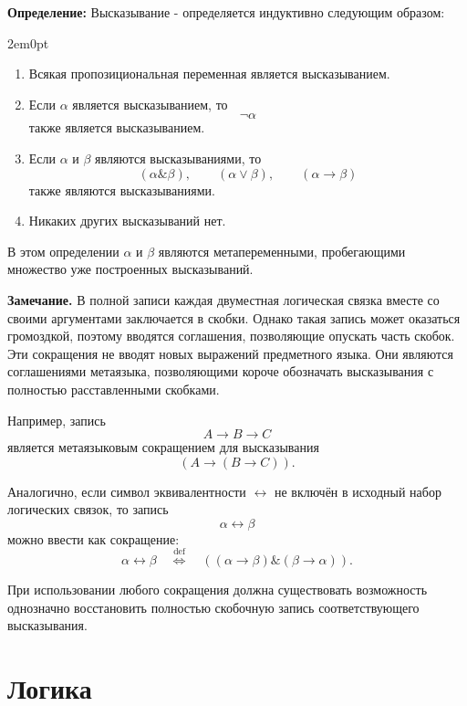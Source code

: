 \documentclass[12pt,a4paper,oneside,openany]{book}
\theoremstyle{definition}
\theoremstyle{plain}
\theoremstyle{remark}
\begin{document}
\textbf{Определение:} Высказывание - определяется индуктивно следующим образом:
\begin{adjustwidth}{2em}{0pt}
\begin{enumerate}
    \item Всякая пропозициональная переменная является высказыванием.

    \item Если \(\alpha\) является высказыванием, то
    \[
    \neg\alpha
    \]
    также является высказыванием.

    \item Если \(\alpha\) и \(\beta\) являются высказываниями, то
    \[
    (\alpha\mathbin{\&}\beta),\qquad
    (\alpha\lor\beta),\qquad
    (\alpha\to\beta)
    \]
    также являются высказываниями.

    \item Никаких других высказываний нет.
\end{enumerate}
\end{adjustwidth}

В этом определении \(\alpha\) и \(\beta\) являются метапеременными,
пробегающими множество уже построенных высказываний.


\vspace{10mm}
\noindent\textbf{Замечание.}
В полной записи каждая двуместная логическая связка вместе со своими
аргументами заключается в скобки. Однако такая запись может оказаться
громоздкой, поэтому вводятся соглашения, позволяющие опускать часть
скобок.
Эти сокращения не вводят новых выражений предметного языка.
Они являются соглашениями метаязыка, позволяющими короче обозначать
высказывания с полностью расставленными скобками.

Например, запись
\[
A\to B\to C
\]
является метаязыковым сокращением для высказывания
\[
(A\to(B\to C)).
\]

Аналогично, если символ эквивалентности \(\leftrightarrow\) не включён
в исходный набор логических связок, то запись
\[
\alpha\leftrightarrow\beta
\]
можно ввести как сокращение:
\[
\alpha\leftrightarrow\beta
\quad\overset{\mathrm{def}}{\Longleftrightarrow}\quad
((\alpha\to\beta)\mathbin{\&}(\beta\to\alpha)).
\]

При использовании любого сокращения должна существовать возможность
однозначно восстановить полностью скобочную запись соответствующего
высказывания.





\section{Логика}
\end{document}
